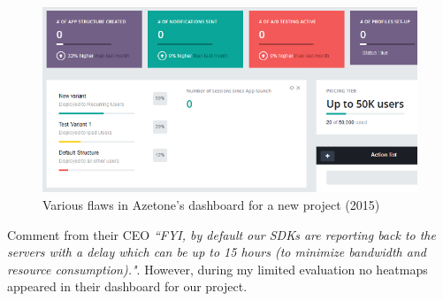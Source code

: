 \begin{figure}[htbp!]
    \centering
    \includegraphics[width=12cm]{images/azetone/azetone_dashboard_flaws_for_kiwix_2015.png}
    \caption{Various flaws in Azetone's dashboard for a new project (2015)}
    \label{fig:azetone_dashboard_flaws_for_kiwix_2015}
\end{figure}

Comment from their CEO \emph{``FYI, by default our SDKs are reporting back to the servers with a delay which can be up to 15 hours (to minimize bandwidth and resource consumption)."}. However, during my limited evaluation no heatmaps appeared in their dashboard for our project.
